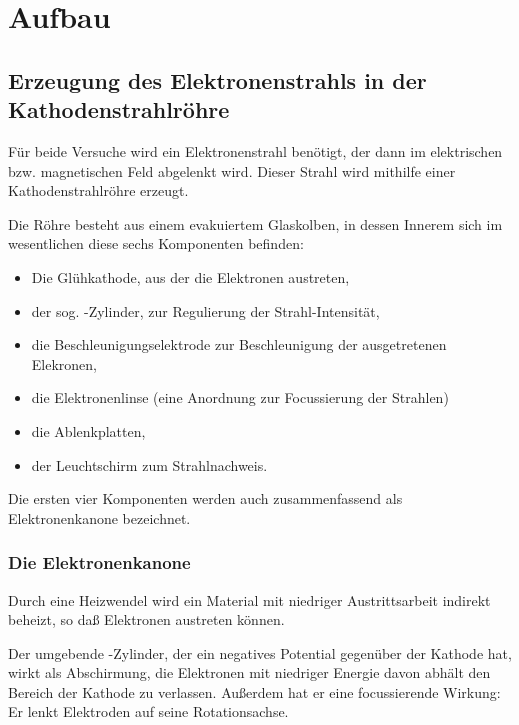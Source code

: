 
\section{Aufbau}

\subsection{Erzeugung des Elektronenstrahls in der Kathodenstrahlröhre}
\label{sec:erzeugung-elektronenstrahl}

Für beide Versuche wird ein Elektronenstrahl benötigt, der dann im
elektrischen bzw. magnetischen Feld abgelenkt wird. Dieser Strahl wird
mithilfe einer Kathodenstrahlröhre erzeugt.

Die Röhre besteht aus einem evakuiertem Glaskolben, in dessen Innerem sich im
wesentlichen diese sechs Komponenten befinden:

\begin{itemize}
\item Die Glühkathode, aus der die Elektronen austreten,
\item der sog. -Zylinder, zur Regulierung der
  Strahl-Intensität,
\item die Beschleunigungselektrode zur Beschleunigung der ausgetretenen
  Elekronen,
\item die Elektronenlinse (eine Anordnung zur Focussierung der Strahlen)
\item die Ablenkplatten,
\item der Leuchtschirm zum Strahlnachweis.
\end{itemize}

Die ersten vier Komponenten werden auch zusammenfassend als
Elektronenkanone bezeichnet.

\subsubsection{Die Elektronenkanone}

Durch eine Heizwendel wird ein Material mit niedriger Austrittsarbeit
indirekt beheizt, so daß Elektronen austreten können. 

Der umgebende -Zylinder, der ein negatives Potential
gegenüber der Kathode hat, wirkt als Abschirmung, die Elektronen mit
niedriger Energie davon abhält den Bereich der Kathode zu
verlassen. Außerdem hat er eine focussierende Wirkung: Er lenkt
Elektroden auf seine Rotationsachse.

